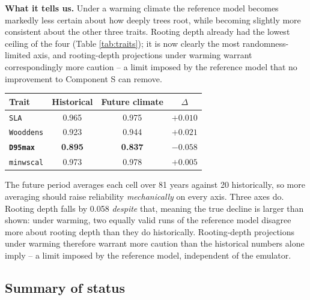 \documentclass[11pt]{article}
\begin{document}
\begin{table}[h]
{\textbf{What it tells us.} Under a warming climate the reference model becomes markedly less certain about how deeply trees root, while becoming slightly more consistent about the other three traits. Rooting depth already had the lowest ceiling of the four (Table \ref{tab:traits}); it is now clearly the most randomness-limited axis, and rooting-depth projections under warming warrant correspondingly more caution -- a limit imposed by the reference model that no improvement to Component S can remove.}
\label{tab:floor}
\small
\begin{tabular}{lccc}
\toprule
Trait & Historical & Future climate & $\Delta$ \\
\midrule
\texttt{SLA} & 0.965 & 0.975 & $+0.010$ \\
\texttt{Wooddens} & 0.923 & 0.944 & $+0.021$ \\
\textbf{\texttt{D95max}} & \textbf{0.895} & \textbf{0.837} & $\mathbf{-0.058}$ \\
\texttt{minwscal} & 0.973 & 0.978 & $+0.005$ \\
\bottomrule
\end{tabular}
\end{table}

The future period averages each cell over 81 years against 20 historically, so more averaging should raise reliability \emph{mechanically} on every axis. Three axes do. Rooting depth falls by 0.058 \emph{despite} that, meaning the true decline is larger than shown: under warming, two equally valid runs of the reference model disagree more about rooting depth than they do historically. Rooting-depth projections under warming therefore warrant more caution than the historical numbers alone imply -- a limit imposed by the reference model, independent of the emulator.

\subsection{Summary of status}
\end{document}
